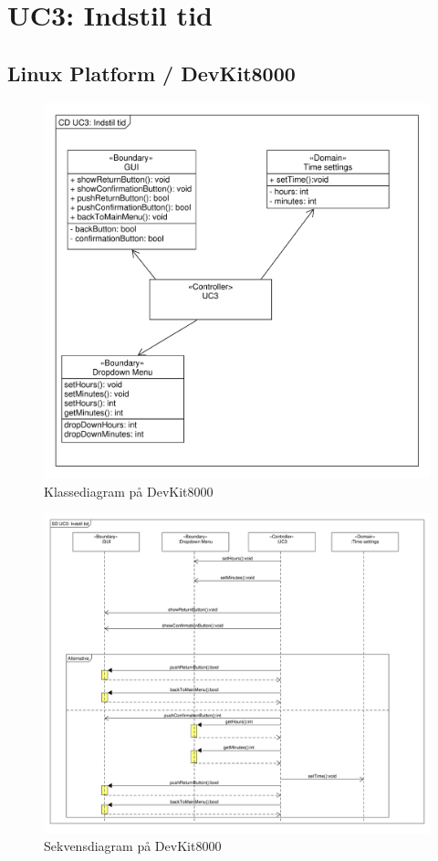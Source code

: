 \section{UC3: Indstil tid}

\subsection{Linux Platform / DevKit8000}
\begin{figure}[H]
	\caption{Klassediagram  på DevKit8000}
	\label{CD:UC3-devkit}
	\includegraphics[scale=0.55,trim=0 0 0 0]{Applikationsmodel_UC3/cd_UC3.pdf}
\end{figure}

\begin{figure}[H]
	\caption{Sekvensdiagram  på DevKit8000}
	\label{SD:UC3-devkit}
	\includegraphics[scale=0.31,trim=0 0 0 0]{Applikationsmodel_UC3/SD_UC3.pdf}
\end{figure}
